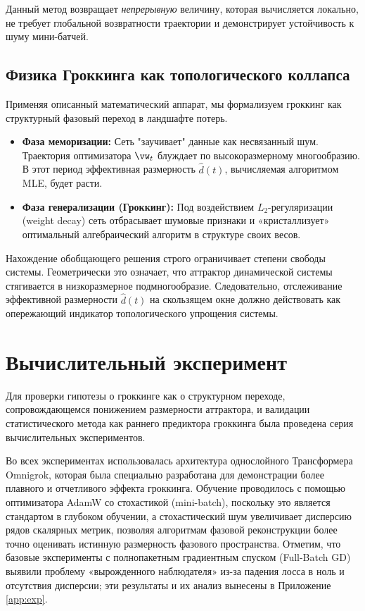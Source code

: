 \documentclass{article}
\begin{document}
Данный метод возвращает \textit{непрерывную} величину, которая вычисляется локально, не требует глобальной возвратности траектории и демонстрирует устойчивость к шуму мини-батчей.

\subsection{Физика Гроккинга как топологического коллапса}\label{sec:theory_grokking}

Применяя описанный математический аппарат, мы формализуем гроккинг как структурный фазовый переход в ландшафте потерь. 
\begin{itemize}
    \item \textbf{Фаза меморизации:} Сеть "заучивает" данные как несвязанный шум. Траектория оптимизатора $\vw_t$ блуждает по высокоразмерному многообразию. В этот период эффективная размерность $\hat{d}(t)$, вычисляемая алгоритмом MLE, будет расти.
    \item \textbf{Фаза генерализации (Гроккинг):} Под воздействием $L_2$-регуляризации (weight decay) сеть отбрасывает шумовые признаки и «кристаллизует» оптимальный алгебраический алгоритм в структуре своих весов.
\end{itemize}

Нахождение обобщающего решения строго ограничивает степени свободы системы. Геометрически это означает, что аттрактор динамической системы стягивается в низкоразмерное подмногообразие. Следовательно, отслеживание эффективной размерности $\hat{d}(t)$ на скользящем окне должно действовать как опережающий индикатор топологического упрощения системы.














\section{Вычислительный эксперимент}\label{sec:exp}

Для проверки гипотезы о гроккинге как о структурном переходе, сопровождающемся понижением размерности аттрактора, и валидации статистического метода как раннего предиктора гроккинга была проведена серия вычислительных экспериментов. 

Во всех экспериментах использовалась архитектура однослойного Трансформера Omnigrok, которая была специально разработана для демонстрации более плавного и отчетливого эффекта гроккинга. Обучение проводилось с помощью оптимизатора AdamW со стохастикой (mini-batch), поскольку это является стандартом в глубоком обучении, а стохастический шум увеличивает дисперсию рядов скалярных метрик, позволяя алгоритмам фазовой реконструкции более точно оценивать истинную размерность фазового пространства. Отметим, что базовые эксперименты с полнопакетным градиентным спуском (Full-Batch GD) выявили проблему «вырожденного наблюдателя» из-за падения лосса в ноль и отсутствия дисперсии; эти результаты и их анализ вынесены в Приложение \ref{app:exp}.
\end{document}
